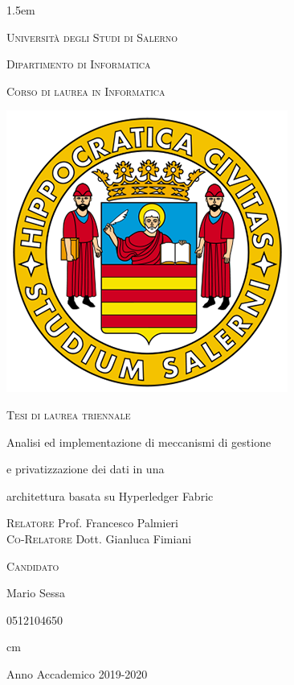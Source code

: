 \documentclass[12pt,italian,a4paper,oneside,openright]{book}
\title{}
\author{}
\date{}
\begin{document}

\baselineskip 1.5em

{ \thispagestyle{empty}


\vskip 1cm \large \centerline{\textsc{Università degli Studi di
Salerno}}

\centerline {\textsc{Dipartimento di Informatica}}

\centerline {\small\textsc{Corso di laurea in Informatica}}

\begin{center}
\vspace{0.5cm}
\includegraphics[scale=0.47]{img/logo.png}
\end{center}


\vskip 0.5cm

\large \centerline {\textsc{Tesi di laurea triennale}}

\vskip 0.5cm

\Large \centerline {Analisi ed implementazione di meccanismi di gestione }
\Large \centerline {e privatizzazione dei dati in una}
\Large \centerline {architettura basata su Hyperledger Fabric}


\vskip 4.5cm


\large

\begin{minipage}[t]{7cm}

\textsc{Relatore}
\newline
Prof. Francesco Palmieri\\
\textsc{Co-Relatore}
\newline
Dott. Gianluca Fimiani
\newline

\end{minipage}
\hfill
\begin{minipage}[t]{5cm}
\hfill 
\textsc{Candidato}

\hfill Mario Sessa

\hfill
0512104650
\end{minipage}
 cm \Large \centerline {Anno Accademico 2019-2020}
\vfill \eject}
\end{document}
